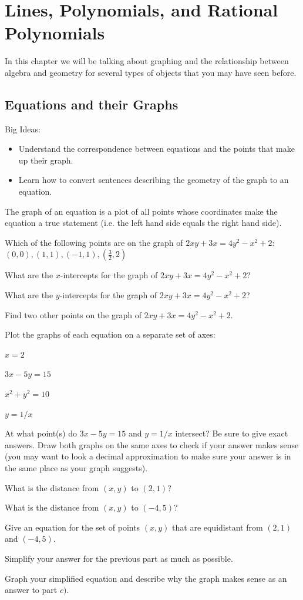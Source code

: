 \chapter{Lines, Polynomials, and Rational Polynomials}
In this chapter we will be talking about graphing and the relationship between algebra and geometry for several types of objects that you may have seen before.
\section{Equations and their Graphs}
Big Ideas:
\begin{itemize}
\item Understand the correspondence between equations and the points that make up their graph.
\item Learn how to convert sentences describing the geometry of the graph to an equation.
\end{itemize}

\begin{info} The graph of an equation is a plot of all points whose coordinates make the equation a true statement (i.e. the left hand side equals the right hand side). \end{info}

\bq Which of the following points are on the graph of $2xy+3x=4y^2-x^2+2$: $(0,0), (1,1), (-1,1), (\frac{3}{2},2)$
\eq

\bq What are the $x$-intercepts for the graph of $2xy+3x=4y^2-x^2+2$?
\eq

\bq What are the $y$-intercepts for the graph of $2xy+3x=4y^2-x^2+2$?
\eq

\bq Find two other points on the graph of $2xy+3x=4y^2-x^2+2$.
\eq

\bq Plot the graphs of each equation on a separate set of axes:
\be
\item $x=2$
\item $3x-5y=15$
\item $x^2+y^2=10$
\item $y=1/x$
\ee
\eq

\bq At what point(s) do $3x-5y=15$ and $y=1/x$ intersect? Be sure to give exact answers. Draw both graphs on the same axes to check if your answer makes sense (you may want to look a decimal approximation to make sure your answer is in the same place as your graph suggests).
\eq

\bq
\be
\item What is the distance from $(x,y)$ to $(2,1)$?
\item What is the distance from $(x,y)$ to $(-4,5)$?
\item Give an equation for the set of points $(x,y)$ that are equidistant from $(2,1)$ and $(-4,5)$.
\item Simplify your answer for the previous part as much as possible.
\item Graph your simplified equation and describe why the graph makes sense as an answer to part $c)$.
\ee
\eq

